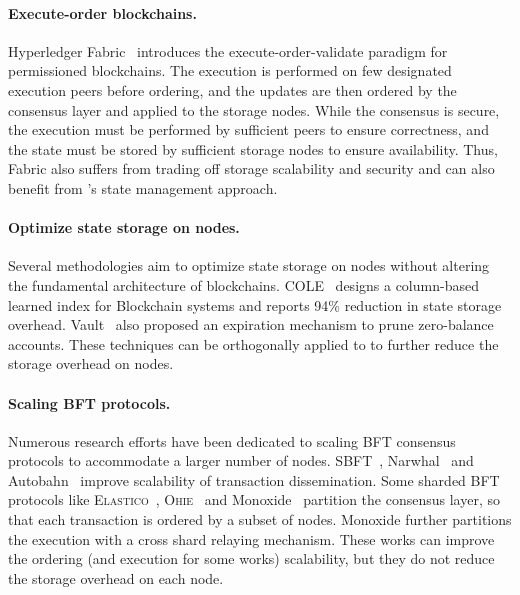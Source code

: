 \paragraph{Execute-order blockchains.}
Hyperledger Fabric~\cite{hyperledger} introduces the execute-order-validate paradigm for permissioned blockchains.
The execution is performed on few designated execution peers before ordering, and the updates are then ordered by the consensus layer and applied to the storage nodes.
While the consensus is secure, the execution must be performed by sufficient peers to ensure correctness, and the state must be stored by sufficient storage nodes to ensure availability.
Thus, Fabric also suffers from trading off storage scalability and security and can also benefit from \sys's state management approach.

\paragraph{Optimize state storage on nodes.}
Several methodologies aim to optimize state storage on nodes without altering the fundamental architecture of blockchains.
COLE~\cite{zhang2024cole} designs a column-based learned index for Blockchain systems and reports 94\% reduction in state storage overhead.
Vault~\cite{leung2018vault} also proposed an expiration mechanism to prune zero-balance accounts.
These techniques can be orthogonally applied to \sys to further reduce the storage overhead on nodes.

\paragraph{Scaling BFT protocols.}
Numerous research efforts have been dedicated to scaling BFT consensus protocols to accommodate a larger number of nodes.
SBFT~\cite{gueta2019sbft}, Narwhal~\cite{narwhal} and Autobahn~\cite{giridharan2024autobahn} improve scalability of transaction dissemination.
Some sharded BFT protocols like \textsc{Elastico}~\cite{luu2016secure}, \textsc{Ohie}~\cite{yu2020ohie} and Monoxide~\cite{wang2019monoxide} partition the consensus layer, so that each transaction is ordered by a subset of nodes.
Monoxide further partitions the execution with a cross shard relaying mechanism.
These works can improve the ordering (and execution for some works) scalability, but they do not reduce the storage overhead on each node.

